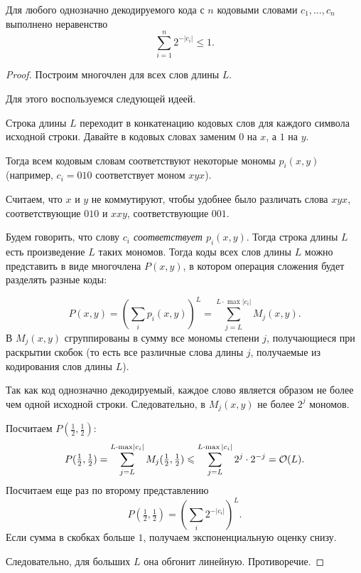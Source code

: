 \newpage
\begin{thm}\label{thm:km}
Для любого однозначно декодируемого кода с $ n$ кодовыми словами $  c_1, \ldots , c_n$ выполнено неравенство
	\[
	\sum_{i=1}^{n} 2^{-\lvert c_i \rvert } \le 1
	.\] 
\end{thm}
\begin{proof}
	Построим многочлен для всех слов длины $ L$. 

	Для этого воспользуемся следующей идеей.

	Строка длины $L$ переходит в конкатенацию кодовых слов для каждого символа исходной строки.
	Давайте в кодовых словах заменим $0$ на $x$, а $1$ на $y$. 

	Тогда всем кодовым словам соответствуют некоторые мономы $ p_i(x, y)$ (например, $c_i = 010$ соответствует моном $xyx$).

	Считаем, что $x$ и $y$ не коммутируют, чтобы удобнее было различать слова $xyx$, соответствующие $010$ и $xxy$, соответствующие $001$. 

	Будем говорить, что слову \textit{$c_i$ соответствует $p_i(x,y)$}. 
	Тогда строка длины $L$ есть произведение $L$ таких мономов. Тогда коды всех слов длины $L$ можно представить в виде многочлена $P(x, y)$, в котором операция сложения будет разделять разные коды:

	\[
		P(x, y) = \left( \sum_{i}^{} p_i(x, y) \right) ^{L} = \sum_{j=L}^{L\cdot\max \lvert c_i\rvert} M_j(x, y)
	.\] 
	В $M_j(x, y)$ сгруппированы в сумму все мономы степени $j$, получающиеся при раскрытии скобок (то есть все различные слова длины $j$, получаемые из кодирования слов длины $L$).

	Так как код однозначно декодируемый, каждое слово является образом не более чем одной исходной строки. Следовательно, в $M_j(x, y)$ не более $2^j$ мономов.

	Посчитаем $ P(\frac{1}{2}, \frac{1}{2})$:
	\[
		P(\tfrac{1}{2},\tfrac{1}{2}) = \sum_{j=L}^{L\cdot\max \lvert c_i\rvert} M_{j}(\tfrac{1}{2},\tfrac{1}{2}) 
		\leqslant \sum_{j=L}^{L \cdot \max |c_i|}2^{j} \cdot 2 ^{-j} = \mathcal{O}(L)
	.\] 
	Посчитаем еще раз по второму представлению
	\[
		P(\tfrac{1}{2},\tfrac{1}{2}) = \left( \sum_{i} 2^{-\lvert c_i \rvert } \right) ^{L}
	.\] 
	Если сумма в скобках больше $ 1$, получаем экспоненциальную оценку снизу.

	Следовательно, для больших $ L$ она обгонит линейную. Противоречие.
\end{proof}

